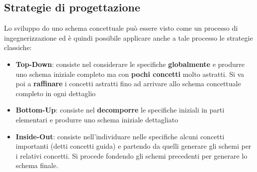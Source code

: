 \documentclass[a4paper,twoside]{article}
\begin{document}
\subsection{Strategie di progettazione}
Lo sviluppo do uno schema concettuale può essere visto come un processo di ingegnerizzazione
ed è quindi possibile applicare anche a tale processo le strategie classiche:
\begin{itemize}
  \item \textbf{Top-Down}: consiste nel considerare le specifiche \textbf{globalmente}
    e produrre uno schema iniziale completo ma con \textbf{pochi concetti} molto astratti.
    Si va poi a \textbf{raffinare} i concetti astratti fino ad arrivare allo schema
    concettuale completo in ogni dettaglio

  \item \textbf{Bottom-Up}: consiste nel \textbf{decomporre} le specifiche iniziali in
    parti elementari e produrre uno schema iniziale dettagliato

  \item \textbf{Inside-Out}: consiste nell'individuare nelle specifiche alcuni concetti
    importanti (detti concetti guida) e partendo da quelli generare gli schemi
    per i relativi concetti. Si procede fondendo gli schemi precedenti per generare
    lo schema finale.
\end{itemize}
\end{document}
